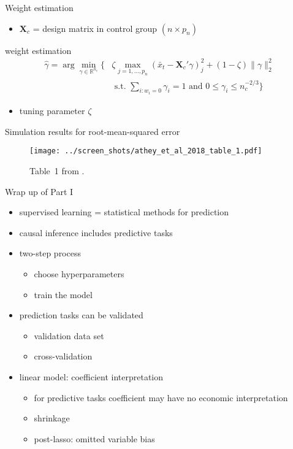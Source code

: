 \documentclass[xcolor=dvipsnames, handout]{beamer}
\begin{document}
\begin{frame}{Weight estimation}
\begin{itemize}
  \item $\mathbf{X}_c$ = design matrix in control group $(n \times p_n)$
\end{itemize}
weight estimation
\begin{align*}
  \hat{\gamma} = \arg \min_{\gamma \in \mathbb{R}^{n_c}} 
  \Big\{ &
    \zeta \max_{j = 1, \dotsc, p_n} (\bar{x}_t - \mathbf{X}_c' \gamma)_j^2 + (1 - \zeta) \lVert  \gamma \rVert_2^2
  \\
    & \text{ s.t. } \sum_{i : w_i = 0} \gamma_i = 1 \text{ and } 0 \leq \gamma_i \leq n_c^{-2/3}
  \Big\}
\end{align*}
\begin{itemize}
  \item tuning parameter $\zeta$
\end{itemize}
\end{frame}

\begin{frame}{Simulation results for root-mean-squared error}
\begin{figure}
  \texttt{[image: ../screen\_shots/athey\_et\_al\_2018\_table\_1.pdf]}
   \caption{Table~1 from \textcite{athey2018approximate}.}
\end{figure}
\end{frame}


\begin{frame}{Wrap up of Part I}
\begin{itemize}[<+-> ]
  \item supervised learning = statistical methods for prediction
  \item causal inference includes predictive tasks
  \item two-step process
  \begin{itemize}
    \item choose hyperparameters 
    \item train the model
  \end{itemize}
  \item prediction tasks can be validated 
  \begin{itemize}
    \item validation data set
    \item cross-validation
  \end{itemize}
  \item linear model: coefficient interpretation
  \begin{itemize}
    \item for predictive tasks coefficient may have no economic interpretation
    \item shrinkage 
    \item post-lasso: omitted variable bias
  \end{itemize}
\end{itemize}
\end{frame}
\end{document}
